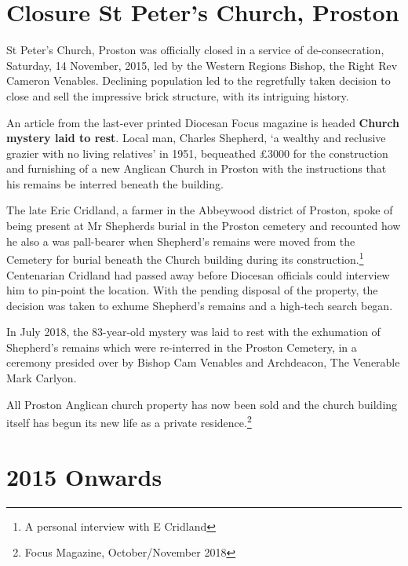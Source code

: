 \hypertarget{closure-st-peters-church-proston}{%
\section{Closure St Peter's Church, Proston}\label{closure-st-peters-church-proston}}

St Peter's Church, Proston was officially closed in a service of de-consecration, Saturday, 14 November, 2015, led by the Western Regions Bishop, the Right Rev Cameron Venables. Declining population led to the regretfully taken decision to close and sell the impressive brick structure, with its intriguing history.

An article from the last-ever printed Diocesan Focus magazine is headed \textbf{Church mystery laid to rest}. Local man, Charles Shepherd, `a wealthy and reclusive grazier with no living relatives' in 1951, bequeathed £3000 for the construction and furnishing of a new Anglican Church in Proston with the instructions that his remains be interred beneath the building.

The late Eric Cridland, a farmer in the Abbeywood district of Proston, spoke of being present at Mr Shepherds burial in the Proston cemetery and recounted how he also a was pall-bearer when Shepherd's remains were moved from the Cemetery for burial beneath the Church building during its construction.\footnote{A personal interview with E Cridland} Centenarian Cridland had passed away before Diocesan officials could interview him to pin-point the location. With the pending disposal of the property, the decision was taken to exhume Shepherd's remains and a high-tech search began.

In July 2018, the 83-year-old mystery was laid to rest with the exhumation of Shepherd's remains which were re-interred in the Proston Cemetery, in a ceremony presided over by Bishop Cam Venables and Archdeacon, The Venerable Mark Carlyon.

All Proston Anglican church property has now been sold and the church building itself has begun its new life as a private residence.\footnote{Focus Magazine, October/November 2018}

\hypertarget{onwards}{%
\section{2015 Onwards}\label{onwards}}

